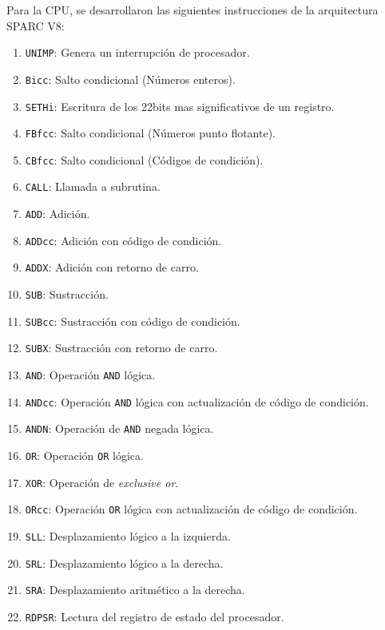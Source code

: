 Para la CPU, se desarrollaron las siguientes instrucciones de la arquitectura SPARC V8:

\begin{enumerate}

\item \texttt{UNIMP}: Genera un interrupción de procesador.
\item \texttt{Bicc}: Salto condicional (Números enteros).
\item \texttt{SETHi}: Escritura de los 22bits mas significativos de un registro.
\item \texttt{FBfcc}: Salto condicional (Números punto flotante).
\item \texttt{CBfcc}: Salto condicional (Códigos de condición).

\item \texttt{CALL}: Llamada a subrutina.

\item \texttt{ADD}: Adición.
\item \texttt{ADDcc}: Adición con código de condición.
\item \texttt{ADDX}: Adición con retorno de carro.

\item \texttt{SUB}: Sustracción.
\item \texttt{SUBcc}: Sustracción con código de condición.
\item \texttt{SUBX}: Sustracción con retorno de carro.

\item \texttt{AND}: Operación \texttt{AND} lógica.
\item \texttt{ANDcc}: Operación \texttt{AND} lógica con actualización de código de condición.
\item \texttt{ANDN}: Operación de \texttt{AND} negada lógica.

\item \texttt{OR}: Operación \texttt{OR} lógica.
\item \texttt{XOR}: Operación de \textit{exclusive or}.
\item \texttt{ORcc}: Operación \texttt{OR} lógica con actualización de código de condición.

\item \texttt{SLL}: Desplazamiento lógico a la izquierda.
\item \texttt{SRL}: Desplazamiento lógico a la derecha.
\item \texttt{SRA}: Desplazamiento aritmético a la derecha.

\item \texttt{RDPSR}: Lectura del registro de estado del procesador.


\end{enumerate}
